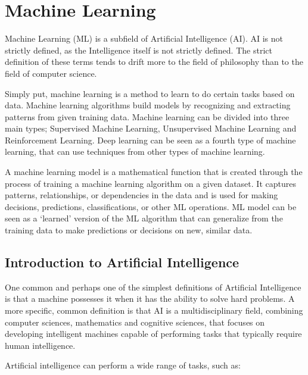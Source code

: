 \chapter{Machine Learning} \label{ml}

Machine Learning (ML) is a subfield of Artificial Intelligence (AI). AI is not strictly defined, as the Intelligence itself is not strictly defined. The strict definition of these terms tends to drift more to the field of philosophy than to the field of computer science.\cite{wang2019defining}

Simply put, machine learning is a method to learn to do certain tasks based on data. Machine learning algorithms build models by recognizing and extracting patterns from given training data. Machine learning can be divided into three main types; Supervised Machine Learning, Unsupervised Machine Learning and Reinforcement Learning. Deep learning can be seen as a fourth type of machine learning, that can use techniques from other types of machine learning.\cite{alpaydin2020introduction}

A machine learning model is a mathematical function that is created through the process of training a machine learning algorithm on a given dataset. It captures patterns, relationships, or dependencies in the data and is used for making decisions, predictions, classifications, or other ML operations. ML model can be seen as a `learned' version of the ML algorithm that can generalize from the training data to make predictions or decisions on new, similar data.

\section{Introduction to Artificial Intelligence} \label{ai}

One common and perhaps one of the simplest definitions of Artificial Intelligence is that a machine possesses it when it has the ability to solve hard problems. A more specific, common definition is that AI is a multidisciplinary field, combining computer sciences, mathematics and cognitive sciences, that focuses on developing intelligent machines capable of performing tasks that typically require human intelligence.\cite{nilsson2009quest}

Artificial intelligence can perform a wide range of tasks, such as:

